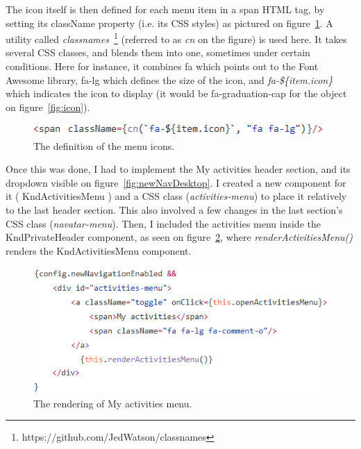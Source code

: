 The icon itself is then defined for each menu item in a span HTML tag, by setting its className property (i.e. its CSS styles) as pictured on {\sc figure}~\ref{fig:classnames}. A utility called \textit{classnames}~\footnote{https://github.com/JedWatson/classnames} (referred to as \textit{cn} on the figure) is used here. It takes several CSS classes, and blends them into one, sometimes under certain conditions. Here for instance, it combines \guillemotleft{} fa \guillemotright{} which points out to the Font Awesome library, \guillemotleft{} fa-lg \guillemotright{} which defines the size of the icon, and \textit{fa-\$\{item.icon\}} which indicates the icon to display (it would be \guillemotleft{} fa-graduation-cap \guillemotright{} for the object on {\sc figure}~\ref{fig:icon}).

\begin{figure}[H]
    \centering
    \includegraphics{figure/classnames.png}
    \caption{The definition of the menu icons.}
    \label{fig:classnames}
\end{figure}

Once this was done, I had to implement the \guillemotleft{} My activities \guillemotright{} header section, and its dropdown visible on {\sc figure}~\ref{fig:newNavDesktop}. I created a new component for it (\guillemotleft{} KndActivitiesMenu \guillemotright{}) and a CSS class (\textit{activities-menu}) to place it relatively to the last header section. This also involved a few changes in the last section's CSS class (\textit{navatar-menu}). Then, I included the activities menu inside the \guillemotleft{} KndPrivateHeader \guillemotright{} component, as seen on {\sc figure}~\ref{fig:activitiesImpl}, where \textit{renderActivitiesMenu()} renders the \guillemotleft{} KndActivitiesMenu \guillemotright{} component.

\begin{figure}[H]
    \centering
    \includegraphics{figure/activitiesImpl.png}
    \caption{The rendering of \guillemotleft{} My activities \guillemotright{} menu.}
    \label{fig:activitiesImpl}
\end{figure}

